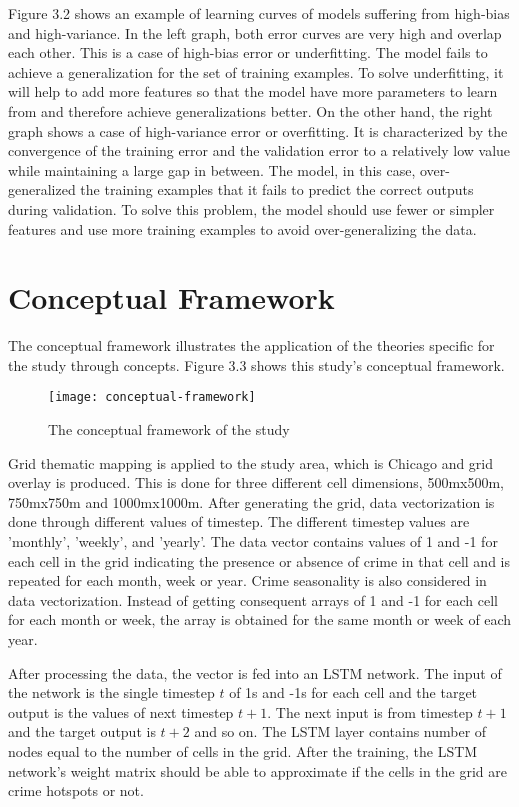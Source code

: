 Figure 3.2 shows an example of learning curves of models suffering from high-bias and high-variance. In the left graph, both error curves are very high and overlap each other. This is a case of high-bias error or underfitting. The model fails to achieve a generalization for the set of training examples. To solve underfitting, it will help to add more features so that the model have more parameters to learn from and therefore achieve generalizations better. On the other hand, the right graph shows a case of high-variance error or overfitting. It is characterized by the convergence of the training error and the validation error to a relatively low value while maintaining a large gap in between. The model, in this case, over-generalized the training examples that it fails to predict the correct outputs during validation. To solve this problem, the model should use fewer or simpler features and use more training examples to avoid over-generalizing the data.

\section{Conceptual Framework}
The conceptual framework illustrates the application of the theories specific for the study through concepts. Figure 3.3 shows this study's conceptual framework.
\begin{figure}[H]
    \centering
    \texttt{[image: conceptual-framework]}
    \caption{The conceptual framework of the study}
\end{figure}
Grid thematic mapping is applied to the study area, which is Chicago and grid overlay is produced. This is done for three different cell dimensions, 500mx500m, 750mx750m and 1000mx1000m. After generating the grid, data vectorization is done through different values of timestep. The different timestep values are 'monthly', 'weekly', and 'yearly'. The data vector contains values of 1 and -1 for each cell in the grid indicating the presence or absence of crime in that cell and is repeated for each month, week or year. Crime seasonality is also considered in data vectorization. Instead of getting consequent arrays of 1 and -1 for each cell for each month or week, the array is obtained for the same month or week of each year.

After processing the data, the vector is fed into an LSTM network. The input of the network is the single timestep $t$ of 1s and -1s for each cell and the target output is the values of next timestep $t+1$. The next input is from timestep $t+1$ and the target output is $t+2$ and so on. The LSTM layer contains number of nodes equal to the number of cells in the grid. After the training, the LSTM network's weight matrix should be able to approximate if the cells in the grid are crime hotspots or not.

